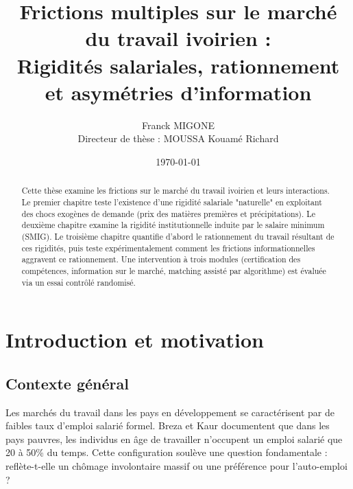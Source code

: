 \documentclass[12pt,a4paper]{article}
\title{\textbf{Frictions multiples sur le marché du travail ivoirien : \\
Rigidités salariales, rationnement et asymétries d'information}}
\author{Franck MIGONE\\
\small Directeur de thèse : MOUSSA Kouamé Richard\\
}
\date{\today}
\begin{document}
\maketitle

\begin{abstract}
Cette thèse examine les frictions sur le marché du travail ivoirien et leurs interactions. Le premier chapitre teste l'existence d'une rigidité salariale "naturelle" en exploitant des chocs exogènes de demande (prix des matières premières et précipitations). Le deuxième chapitre examine la rigidité institutionnelle induite par le salaire minimum (SMIG). Le troisième chapitre quantifie d'abord le rationnement du travail résultant de ces rigidités, puis teste expérimentalement comment les frictions informationnelles aggravent ce rationnement. Une intervention à trois modules (certification des compétences, information sur le marché, matching assisté par algorithme) est évaluée via un essai contrôlé randomisé. %
\end{abstract}

\newpage
\tableofcontents
\newpage

\section{Introduction et motivation}

\subsection{Contexte général}

Les marchés du travail dans les pays en développement se caractérisent par de faibles taux d'emploi salarié formel. Breza et Kaur \citeyearpar{breza2025} documentent que dans les pays pauvres, les individus en âge de travailler n'occupent un emploi salarié que 20 à 50\% du temps. Cette configuration soulève une question fondamentale : reflète-t-elle un chômage involontaire massif ou une préférence pour l'auto-emploi ?
\end{document}

